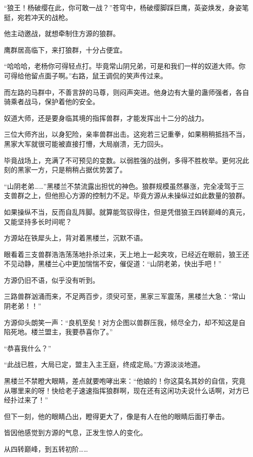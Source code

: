 \begin{this_body}
“狼王！杨破缨在此，你可敢一战？”苍穹中，杨破缨脚踩巨鹰，英姿焕发，身姿笔挺，宛若冲天的战枪。

他主动邀战，就想牵制住方源的狼群。

鹰群居高临下，来打狼群，十分占便宜。

“哈哈哈，老杨你可得轻点打。毕竟常山阴兄弟，可是和我们一样的奴道大师。你可得给他留点面子啊。”右路，鼠王调侃的笑声传过来。

而左路的马群中，不善言辞的马尊，则闷声突进。他身边有大量的蛊师强者，各自骑乘者战马，保护着他的安全。

奴道大师，还是要身临其境的指挥兽群，才能发挥出十二分的战力。

三位大师齐出，以身犯险，亲率兽群出击。这宛若三记重拳，如果稍稍抵挡不当，黑家大军就很可能被直接打懵，大局崩溃，无力回头。

毕竟战场上，充满了不可预见的变数。以弱胜强的战例，多得不胜枚举。更何况此刻的黑家一方，只是稍稍占据优势罢了。

“山阴老弟……”黑楼兰不禁流露出担忧的神色。狼群规模虽然暴涨，完全凌驾于三支兽群之上，但他担心方源的控制力不足。毕竟方源从未操纵过如此数量的狼群。

如果操纵不当，反而自乱阵脚。就算能驾驭得住，但是凭借狼王四转巅峰的真元，又能坚持多长时间呢？

方源站在铁犀头上，背对着黑楼兰，沉默不语。

眼看着三支兽群浩浩荡荡地扑杀过来，天上地上一起夹攻，已经近在眼前，狼王还不见动静，黑楼兰心中更加惴惴不安，催促道：“山阴老弟，快出手吧！”

方源仍旧不语，似乎没有听到。

三路兽群汹涌而来，不足两百步，须臾可至，黑家三军震荡，黑楼兰大急：“常山阴老弟！！”

方源仰头朗笑一声：“良机至矣！对方企图以兽群压我，倾尽全力，却不知这是自陷死地。楼兰盟主，我要恭喜你了。”

“恭喜我什么？”

“此战已胜，大局已定，盟主入主王庭，终成定局。”方源淡淡地道。

黑楼兰不禁瞪大眼睛，差点就要咆哮出来：“他娘的！你这莫名其妙的自信，究竟从哪里来的呀！快给老子速速指挥狼群啊，现在还有这闲功夫说什么话啊，对方已经扑过来了！”

但下一刻，他的眼睛凸出，瞪得更大了，像是有人在他的眼睛后面打拳击。

皆因他感觉到方源的气息，正发生惊人的变化。

从四转巅峰，到五转初阶……


\end{this_body}
